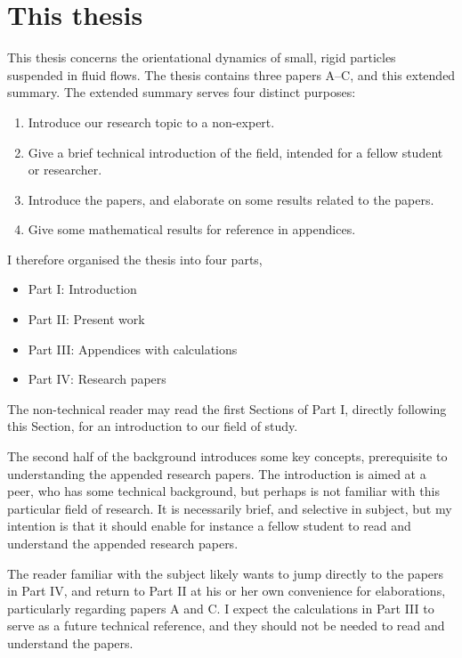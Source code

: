 \documentclass[thesis.tex]{subfiles}
\begin{document}
\section*{This thesis}

This thesis concerns the orientational dynamics of small, rigid particles suspended in fluid flows. 
The thesis contains three papers A--C, and this extended summary. The extended summary serves four distinct purposes:
\begin{enumerate}
	\item Introduce our research topic to a non-expert.
	\item Give a brief technical introduction of the field, intended for a fellow student or researcher.
	\item Introduce the papers, and elaborate on some results related to the papers.
	\item Give some mathematical results for reference in appendices.
\end{enumerate}
I therefore organised the thesis into four parts,
\begin{itemize}
	\item Part I: Introduction
	\item Part II: Present work
	\item Part III: Appendices with calculations
	\item Part IV: Research papers
\end{itemize}
The non-technical reader may read the first Sections of Part I, directly following this Section, for an introduction to our field of study. 

The second half of the background introduces some key concepts, prerequisite to understanding the appended research papers. The introduction is aimed at a peer, who has some technical background, but perhaps is not familiar with this particular field of research. It is necessarily brief, and selective in subject, but my intention is that it should enable for instance a fellow student to read and understand the appended research papers.

The reader familiar with the subject likely wants to jump directly to the papers in Part IV, and return to Part II at his or her own convenience for elaborations, particularly regarding papers A and C. I expect the calculations in Part III to serve as a future technical reference, and they should not be needed to read and understand the papers.
\end{document}
